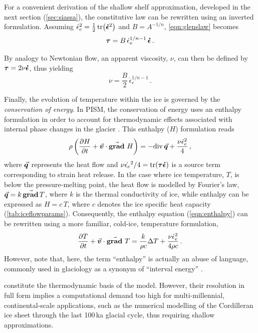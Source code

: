 \documentclass{article}
\newcommand{\vect}[1]{\va*{#1}} %
\newcommand{\tens}[1]{\vb*{#1}} %
\renewcommand{\div}[1]{\mathrm{div}\,#1}            %
\renewcommand{\grad}[1]{\vect{\mathrm{grad}}\,#1}   %
\newcommand{\matdv}[1]{\pdv{#1}{t}+\vect{v}\cdot\grad{}\,#1}  %
\newcommand{\doteps}[0]{\dot{\epsilon}} %
\newcommand{\DST}[0]{\tens{\tau}}       %
\newcommand{\SRT}[0]{\tens{\doteps}}    %
\begin{document}
For a convenient derivation of the shallow shelf approximation, developed in
the next section (\cref{sec:siassa}), the constitutive law can be rewritten
using an inverted formulation. Assuming
${{\doteps_e}^2 = \frac{1}{2} \tr(\SRT^2)}$ and ${B=A^{-1/n}}$,
\cref{eqn:glenslaw} becomes
\begin{equation}
    \label{eqn:invglenslaw}
    \DST = B\,\doteps_e^{1/n-1}\,\SRT \,.
\end{equation}

By analogy to Newtonian flow, an apparent viscosity, $\nu$, can then be defined
by ${\DST = 2 \nu\SRT}$, thus yielding
\begin{equation}
    \label{eqn:viscosity}
    \nu = \frac{B}{2}\,\doteps_e^{1/n-1} \,.
\end{equation}

Finally, the evolution of temperature within the ice is governed by the
\emph{conservation of energy}. In PISM, the conservation of energy uses an
enthalpy formulation in order to
account for thermodynamic effects associated with internal phase changes in the
glacier \citep[Eqs.~20--21]{Aschwanden.etal.2012}. This enthalpy ($H$)
formulation reads
\begin{equation}
    \label{eqn:enthalpy}
    \rho \left(\matdv{H}\right)
        = -\div{\vect{q}} + \frac{\nu\doteps_e^2}{4} \,,
\end{equation}
where $\vect{q}$ represents the heat flow and
${\nu\dot{\epsilon_e}^2/4 = \tr(\DST\SRT)}$ is a
source term corresponding to strain heat release. In the case where ice
temperature, $T$, is below the pressure-melting point, the heat flow is
modelled by Fourier's law, $\vect{q} = k\,\grad{T}$, where $k$ is the thermal
conductivity of ice, while enthalpy can be expressed as $H=c\,T$, where $c$
denotes the ice specific heat capacity (\cref{tab:iceflowparams}).
Consequently, the enthalpy equation (\ref{eqn:enthalpy}) can be rewritten using
a more familiar, cold-ice, temperature formulation,
\begin{equation}
    \label{eqn:temperature}
    \matdv{T} = \frac{k}{\rho c} \Delta T
                + \frac{\nu\doteps_e^2}{4\rho c} \,.
\end{equation}
However, note that, here, the term ``enthalpy'' is actually an abuse of
language, commonly used in glaciology as a synonym of ``interval energy''
\citep{Aschwanden.etal.2012}.

constitute the thermodynamic basis
of the model. However, their resolution in full form implies a computational
demand too high for multi-millennial, continental-scale applications, such as
the numerical modelling of the Cordilleran ice sheet through the last 100\,ka
glacial cycle, thus requiring shallow approximations.
\end{document}
